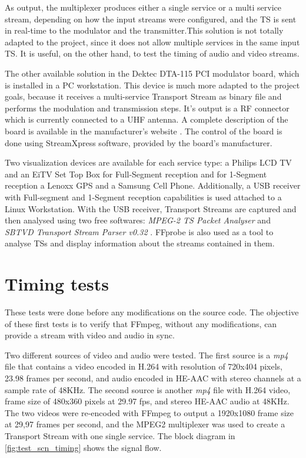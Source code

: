 \documentclass[
	12pt,				%
	openright,			%
	twoside,			%
	a4paper,			%
	brazil,
	french,				%
	english
	]{abntex2}
\begin{document}
As output, the multiplexer produces either a single service or a multi service stream, depending on how the input streams were configured, and the TS is sent in real-time to the modulator and the transmitter.This solution is not totally adapted to the project, since it does not allow multiple services in the same input TS. It is useful, on the other hand, to test the timing of audio and video streams.

The other available solution in the Dektec DTA-115 PCI modulator board, which is installed in a PC workstation. This device is much more adapted to the project goals, because it receives a multi-service Transport Stream as binary file and performs the modulation and transmission steps. It's output is a RF connector which is currently connected to a  UHF antenna. A complete description of the board is available in the manufacturer's website \cite{dektec}. The control of the board is done using StreamXpress software, provided by the board's manufacturer.


Two visualization devices are available for each service type: a Philips LCD TV and an EiTV Set Top Box for Full-Segment reception and for 1-Segment reception a Lenoxx GPS and a Samsung Cell Phone. Additionally, a USB receiver with Full-segment and 1-Segment reception capabilities is used attached to a Linux Workstation. With the USB receiver, Transport Streams are captured and then analysed using two free softwares: \textit{MPEG-2 TS Packet Analyser} \cite{} and \textit{SBTVD Transport Stream Parser v0.32} \cite{}. FFprobe is also used as a tool to analyse TSs and display information about the streams contained in them.

\section{Timing tests}

These tests were done before any modifications on the source code. The objective of these first tests is to verify that FFmpeg, without any modifications, can provide a stream with video and audio in sync. 

Two different sources of video and audio were tested. The first source is a \textit{mp4} file that contains a video encoded in H.264 with resolution of 720x404 pixels, 23.98 frames per second, and audio encoded in HE-AAC with stereo channels at a sample rate of 48KHz. The second source is another \textit{mp4} file with H.264 video, frame size of 480x360 pixels at 29.97 fps, and stereo HE-AAC audio at 48KHz. The two videos were re-encoded with FFmpeg to output a 1920x1080 frame size at 29,97 frames per second, and the MPEG2 multiplexer was used to create a Transport Stream with one single service. The block diagram in \autoref{fig:test_scn_timing} shows the signal flow.
\end{document}
